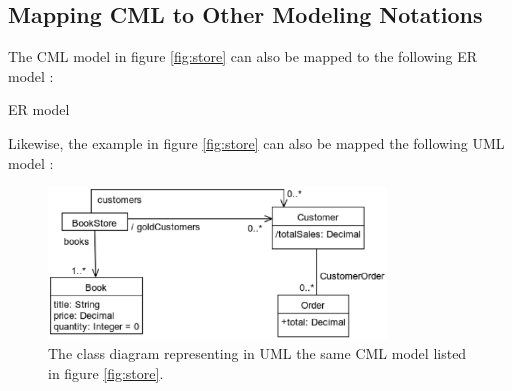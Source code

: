 \subsection{Mapping CML to Other Modeling Notations}\label{subsec:mapping}

The CML model in figure \ref{fig:store} can also be mapped to the following ER model \cite{er}:

{ER model}

Likewise, the example in figure \ref{fig:store} can also be mapped the following UML model \cite{uml}:

\begin{figure}
\centering
\includegraphics[width=0.8\textwidth]{language/diagram-uml}
\caption{The class diagram representing in UML  \cite{uml} the same CML model listed in figure \ref{fig:store}.}
\label{fig:uml}
\end{figure}

